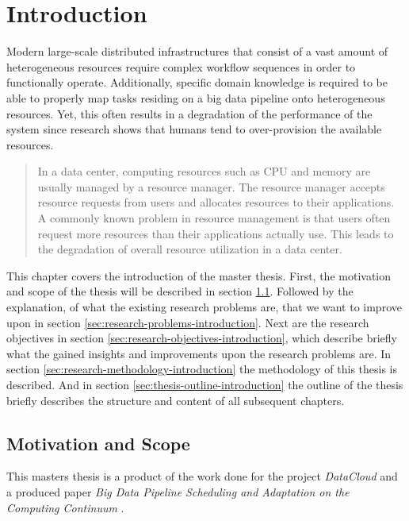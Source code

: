 \chapter{Introduction}
\label{ch:introduction}

    Modern large-scale distributed infrastructures that consist of a vast amount of heterogeneous resources require complex workflow sequences in order to functionally operate. Additionally, specific domain knowledge is required to be able to properly map tasks residing on a big data pipeline onto heterogeneous resources. Yet, this often results in a degradation of the performance of the system since research shows that humans tend to over-provision the available resources.

    \begin{quote}
        In a data center, computing resources such as CPU and memory are usually managed by a resource manager. The resource manager accepts resource requests from users and allocates resources to their applications. A commonly known problem in resource management is that users often request more resources than their applications actually use. This leads to the degradation of overall resource utilization in a data center. \cite{thonglekImprovingResourceUtilization2019}
    \end{quote}

    This chapter covers the introduction of the master thesis.
    First, the motivation and scope of the thesis will be described in section \ref{sec:motivation-and-scope-introduction}.
    Followed by the explanation, of what the existing research problems are, that we want to improve upon in section \ref{sec:research-problems-introduction}. Next are the research objectives in section \ref{sec:research-objectives-introduction}, which describe briefly what the gained insights and improvements upon the research problems are. In section \ref{sec:research-methodology-introduction} the methodology of this thesis is described. And in section \ref{sec:thesis-outline-introduction} the outline of the thesis briefly describes the structure and content of all subsequent chapters.

        \section{Motivation and Scope}
        \label{sec:motivation-and-scope-introduction}

            This masters thesis is a product of the work done for the project \emph{DataCloud} and a produced paper \emph{Big Data Pipeline Scheduling and Adaptation on the Computing Continuum} \cite{kimovskiBigDataPipeline2022}.

